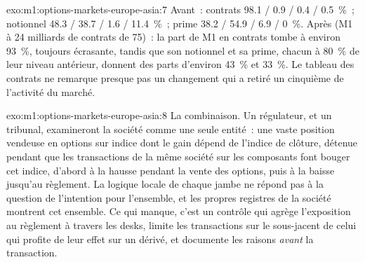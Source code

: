 \begin{solution}{exo:m1:options-markets-europe-asia:7}
Avant~: contrats 98.1 / 0.9 / 0.4 / 0.5~\%~; notionnel 48.3 / 38.7 / 1.6 /
11.4~\%~; prime 38.2 / 54.9 / 6.9 / 0~\%. Après (M1 à 24 milliards de contrats de
 75)~: la part de M1 en contrats tombe à environ 93~\%, toujours écrasante,
tandis que son notionnel et sa prime, chacun à 80~\% de leur niveau antérieur, donnent des parts d'environ 43~\%
et 33~\%. Le tableau des contrats ne remarque presque pas un changement qui a retiré un cinquième de
l'activité du marché.
\end{solution}

\begin{solution}{exo:m1:options-markets-europe-asia:8}
La combinaison. Un régulateur, et un tribunal, examineront la société comme une seule
entité~: une vaste position vendeuse en options sur indice dont le gain dépend de
l'indice de clôture, détenue pendant que les transactions de la même société sur les composants
font bouger cet indice, d'abord à la hausse pendant la vente des options, puis à la baisse jusqu'au
règlement. La logique locale de chaque jambe ne répond pas à la question de
l'intention pour l'ensemble, et les propres registres de la société montrent cet ensemble. Ce qui
manque, c'est un contrôle qui agrège l'exposition au règlement à travers
les desks, limite les transactions sur le sous-jacent de celui qui profite de leur effet
sur un dérivé, et documente les raisons \emph{avant} la transaction.
\end{solution}

